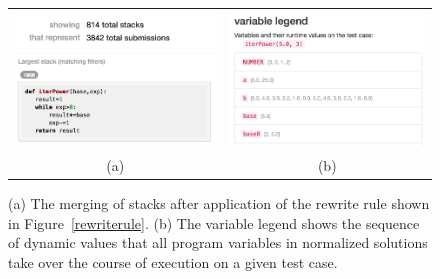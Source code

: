 \begin{figure}[htpb]
\begin{tabular}{c | c}
\begin{minipage}{.5\linewidth}
\centering
\includegraphics[scale=0.4]{Body/figures/overcode/afterrewrite.png}
\end{minipage}
&
\begin{minipage}{.5\linewidth}
\centering
\includegraphics[scale=0.4]{Body/figures/overcode/variableLegend.png}
\end{minipage}
\\
(a) & (b)
\end{tabular}
\caption{(a) The merging of stacks after application of the rewrite rule shown in Figure~\ref{rewriterule}. (b) The variable legend shows the sequence of dynamic values that all program variables in normalized solutions take over the course of execution on a given test case.}
\label{afterrewrite}
\end{figure}

